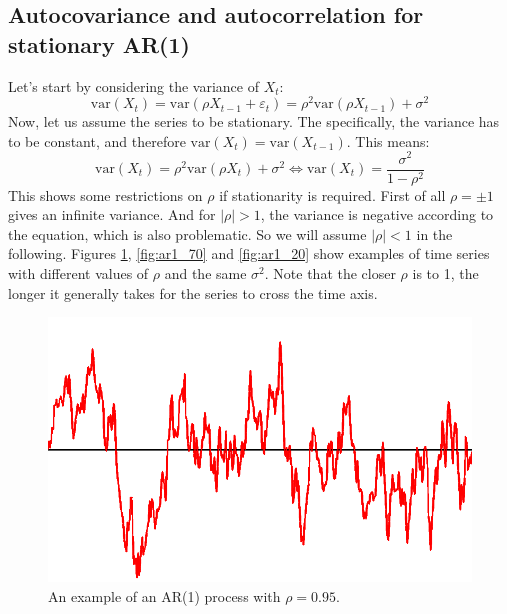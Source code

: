 \documentclass[12pt, a4paper]{article}
\numberwithin{equation}{section}
\begin{document}
\subsection{Autocovariance and autocorrelation for stationary AR(1)}
Let's start by considering the variance of $X_t$:
\begin{equation}
\textrm{var}(X_t)=\textrm{var}(\rho X_{t-1}+\varepsilon_t)=\rho^2\textrm{var}(\rho X_{t-1})+\sigma^2
\end{equation}
Now, let us assume the series to be stationary. The specifically, the variance has to be constant, and therefore $\textrm{var}(X_t)=\textrm{var}(X_{t-1})$. This means:
\begin{equation}
\label{AR1_variance}
\textrm{var}(X_t)=\rho^2\textrm{var}(\rho X_t)+\sigma^2\Leftrightarrow\textrm{var}(X_t)=\frac{\sigma^2}{1-\rho^2}
\end{equation}
This shows some restrictions on $\rho$ if stationarity is required. First of all $\rho=\pm 1$ gives an infinite variance. And for $|\rho|>1$, the variance is negative according to the equation, which is also problematic. So we will assume $|\rho|<1$ in the following. Figures \ref{fig:ar1_95}, \ref{fig:ar1_70} and \ref{fig:ar1_20} show examples of time series with different values of $\rho$ and the same $\sigma^2$. Note that the closer $\rho$ is to 1, the longer it generally takes for the series to cross the time axis.

\begin{figure}
\centering
\includegraphics[width=\textwidth]{ar1_95}
\caption{An example of an AR(1) process with $\rho=0.95$.}
\label{fig:ar1_95}
\end{figure}
\end{document}
